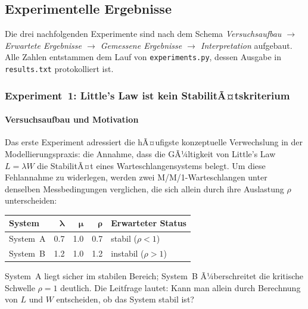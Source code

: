 ﻿\documentclass[a4paper,12pt]{scrreprt}
\theoremstyle{definition}
\begin{document}
\subsection{Experimentelle Ergebnisse}
\label{subsec:experimente}

Die drei nachfolgenden Experimente sind nach dem Schema
\emph{Versuchsaufbau $\to$ Erwartete Ergebnisse $\to$ Gemessene
	Ergebnisse $\to$ Interpretation} aufgebaut.  Alle Zahlen entstammen
dem Lauf von \texttt{experiments.py}, dessen Ausgabe in
\texttt{results.txt} protokolliert ist.

\subsubsection{Experiment~1: Little's Law ist kein StabilitÃ¤tskriterium}
\label{subsubsec:exp1}

\paragraph{Versuchsaufbau und Motivation}

Das erste Experiment adressiert die hÃ¤ufigste konzeptuelle
Verwechslung in der Modellierungspraxis: die Annahme, dass die
GÃ¼ltigkeit von Little's Law $L = \lambda W$ die StabilitÃ¤t eines
Warteschlangensystems belegt.  Um diese Fehlannahme zu widerlegen,
werden zwei M/M/1-Warteschlangen unter denselben Messbedingungen
verglichen, die sich allein durch ihre Auslastung $\rho$ unterscheiden:

\begin{center}
	\begin{tabular}{@{}lrrrl@{}}
		\toprule
		\textbf{System} & $\boldsymbol{\lambda}$ & $\boldsymbol{\mu}$ &
		$\boldsymbol{\rho}$ & \textbf{Erwarteter Status} \\
		\midrule
		System~A & 0.7 & 1.0 & 0.7 & stabil ($\rho < 1$) \\
		System~B & 1.2 & 1.0 & 1.2 & instabil ($\rho > 1$) \\
		\bottomrule
	\end{tabular}
\end{center}

System~A liegt sicher im stabilen Bereich; System~B Ã¼berschreitet die
kritische Schwelle $\rho = 1$ deutlich.  Die Leitfrage lautet: Kann
man allein durch Berechnung von $L$ und $W$ entscheiden, ob das System
stabil ist?
\end{document}
